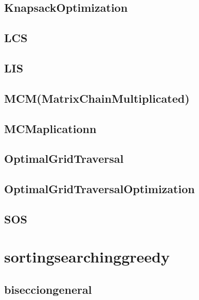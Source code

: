 \documentclass{article}
\begin{document}
\subsection{KnapsackOptimization}


\subsection{LCS}


\subsection{LIS}


\subsection{MCM(MatrixChainMultiplicated)}


\subsection{MCMaplicationn}


\subsection{OptimalGridTraversal}


\subsection{OptimalGridTraversalOptimization}


\subsection{SOS}


\section{sortingsearchinggreedy}
\subsection{bisecciongeneral}

\end{document}
